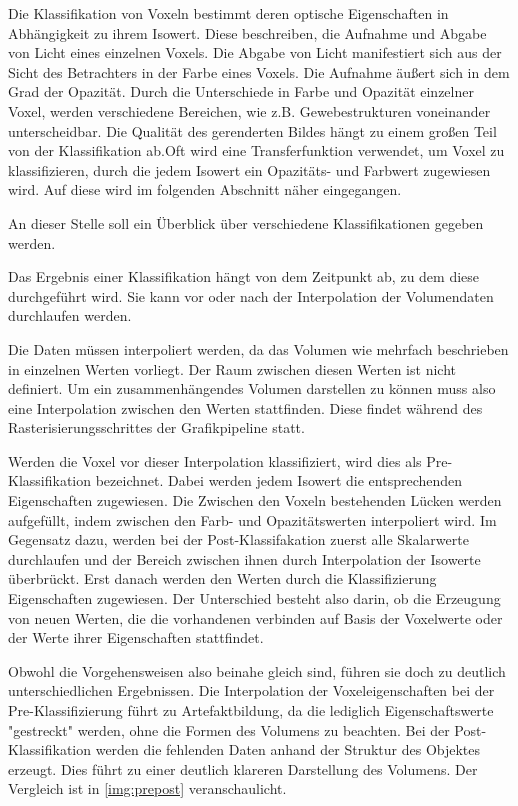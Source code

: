 Die Klassifikation von Voxeln bestimmt deren optische Eigenschaften in Abhängigkeit zu ihrem Isowert. Diese beschreiben, die Aufnahme und Abgabe von Licht eines einzelnen Voxels. Die Abgabe von Licht manifestiert sich aus der Sicht des Betrachters in der Farbe eines Voxels. Die Aufnahme äußert sich in dem Grad der Opazität. Durch die Unterschiede in Farbe und Opazität einzelner Voxel, werden verschiedene Bereichen, wie z.B. Gewebestrukturen voneinander unterscheidbar. Die Qualität des gerenderten Bildes hängt zu einem großen Teil von der Klassifikation ab.Oft wird eine Transferfunktion verwendet, um Voxel zu klassifizieren, durch die jedem Isowert ein Opazitäts- und Farbwert zugewiesen wird. Auf diese wird im folgenden Abschnitt näher eingegangen. 

An dieser Stelle soll ein Überblick über verschiedene Klassifikationen gegeben werden.

Das Ergebnis einer Klassifikation hängt von dem Zeitpunkt ab, zu dem diese durchgeführt wird. Sie kann vor oder nach der Interpolation der Volumendaten durchlaufen werden.

Die Daten müssen interpoliert werden, da das Volumen wie mehrfach beschrieben in einzelnen Werten vorliegt. Der Raum zwischen diesen Werten ist nicht definiert. Um ein zusammenhängendes Volumen darstellen zu können muss also eine Interpolation zwischen den Werten stattfinden. Diese findet während des Rasterisierungsschrittes der Grafikpipeline statt.

Werden die Voxel vor dieser Interpolation klassifiziert, wird dies als Pre-Klassifikation bezeichnet. Dabei werden jedem Isowert die entsprechenden Eigenschaften zugewiesen. Die Zwischen den Voxeln bestehenden Lücken werden aufgefüllt, indem zwischen den Farb- und Opazitätswerten interpoliert wird. 
Im Gegensatz dazu, werden bei der Post-Klassifakation zuerst alle Skalarwerte durchlaufen und der Bereich zwischen ihnen durch Interpolation der Isowerte überbrückt. Erst danach werden den Werten durch die Klassifizierung Eigenschaften zugewiesen. Der Unterschied besteht also darin, ob die Erzeugung von neuen Werten, die die vorhandenen verbinden auf Basis der Voxelwerte oder der Werte ihrer Eigenschaften stattfindet. \citet{Hadwiger06}

Obwohl die Vorgehensweisen also beinahe gleich sind, führen sie doch zu deutlich unterschiedlichen Ergebnissen. Die Interpolation der Voxeleigenschaften bei der Pre-Klassifizierung führt zu Artefaktbildung, da die lediglich Eigenschaftswerte "gestreckt" werden, ohne die Formen des Volumens zu beachten. Bei der Post-Klassifikation werden die fehlenden Daten anhand der Struktur des Objektes erzeugt. Dies führt zu einer deutlich klareren Darstellung des Volumens. Der Vergleich ist in \ref{img:prepost} veranschaulicht.

